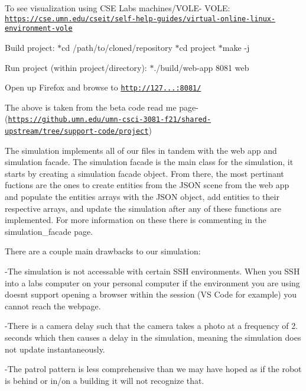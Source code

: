To see visualization using C\+SE Labs machines/\+V\+O\+L\+E-\/ V\+O\+LE\+: \href{https://cse.umn.edu/cseit/self-help-guides/virtual-online-linux-environment-vole}{\tt https\+://cse.\+umn.\+edu/cseit/self-\/help-\/guides/virtual-\/online-\/linux-\/environment-\/vole}
\begin{DoxyEnumerate}
\item Build project\+: $\ast$cd /path/to/cloned/repository $\ast$cd project $\ast$make -\/j
\item Run project (within project/directory)\+: $\ast$./build/web-\/app 8081 web
\item Open up Firefox and browse to \href{http://127.0.0.1:8081/}{\tt http\+://127...\+:8081/}
\end{DoxyEnumerate}

The above is taken from the beta code read me page-\/ (\href{https://github.umn.edu/umn-csci-3081-f21/shared-upstream/tree/support-code/project}{\tt https\+://github.\+umn.\+edu/umn-\/csci-\/3081-\/f21/shared-\/upstream/tree/support-\/code/project})

The simulation implements all of our files in tandem with the web app and simulation facade. The simulation facade is the main class for the simulation, it starts by creating a simulation facade object. From there, the most pertinant fuctions are the ones to create entities from the J\+S\+ON scene from the web app and populate the entities arrays with the J\+S\+ON object, add entities to their respective arrays, and update the simulation after any of these functions are implemented. For more information on these there is commenting in the simulation\+\_\+facade page.

There are a couple main drawbacks to our simulation\+:

-\/\+The simulation is not accessable with certain S\+SH environments. When you S\+SH into a labs computer on your personal computer if the environment you are using doesn\textquotesingle{}t support opening a browser within the session (VS Code for example) you cannot reach the webpage.

-\/\+There is a camera delay such that the camera takes a photo at a frequency of 2. seconds which then causes a delay in the simulation, meaning the simulation does not update instantaneously.

-\/\+The patrol pattern is less comprehensive than we may have hoped as if the robot is behind or in/on a building it will not recognize that.

